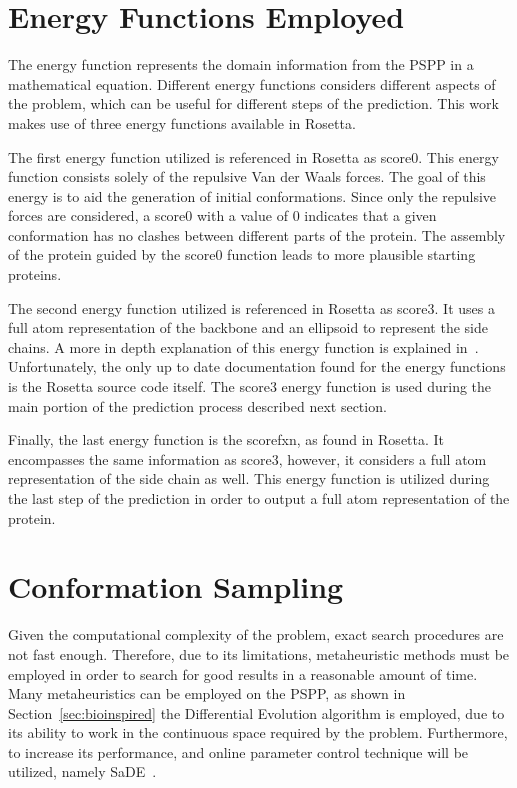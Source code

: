 \section{Energy Functions Employed}
\label{sec:energy-function}

The energy function represents the domain information from the \ac{PSPP} in a
mathematical equation. Different energy functions considers different aspects
of the problem, which can be useful for different steps of the prediction. This
work makes use of three energy functions available in Rosetta.

The first energy function utilized is referenced in Rosetta as score0. This
energy function consists solely of the repulsive Van der Waals forces. The goal
of this energy is to aid the generation of initial conformations. Since only
the repulsive forces are considered, a score0 with a value of $0$ indicates
that a given conformation has no clashes between different parts of the
protein. The assembly of the protein guided by the score0 function leads to
more plausible starting proteins.

The second energy function utilized is referenced in Rosetta as score3. It uses
a full atom representation of the backbone and an ellipsoid to represent the
side chains. A more in depth explanation of this energy function is explained
in~\cite{alford2017rosetta}. Unfortunately, the only up to date documentation
found for the energy functions is the Rosetta source code itself.  The score3
energy function is used during the main portion of the prediction process
described next section.

Finally, the last energy function is the scorefxn, as found in Rosetta. It
encompasses the same information as score3, however, it considers a full atom
representation of the side chain as well. This energy function is utilized
during the last step of the prediction in order to output a full atom
representation of the protein.

\section{Conformation Sampling}
\label{sec:conformation-sampling}

Given the computational complexity of the problem, exact search procedures are
not fast enough. Therefore, due to its limitations,
metaheuristic methods must be employed in order to search for good results
in a reasonable amount of time. Many metaheuristics can be employed
on the \ac{PSPP}, as shown in Section~\ref{sec:bioinspired}
the Differential Evolution algorithm is employed, due to its ability to work
in the continuous space required by the problem. Furthermore, to increase
its performance, and online parameter control technique will be
utilized, namely \ac{SaDE}~\cite{qin2005self,qin2009differential}.

